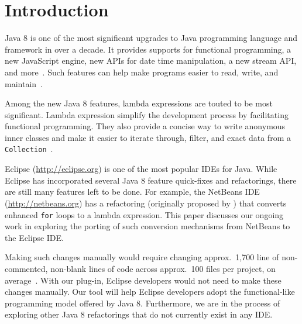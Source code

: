 \section{Introduction}

Java 8 is one of the most significant upgrades to Java programming language
and framework in over a decade. It provides supports for functional
programming, a new JavaScript engine, new APIs for date time manipulation, a
new stream API, and more~\cite{newjdk}. Such features can help make programs
easier to read, write, and maintain~\cite{gyori2013}.

Among the new Java 8 features, lambda expressions are touted to be most
significant. Lambda expression simplify the development process by
facilitating functional programming. They also provide a concise way to write
anonymous inner classes and make it easier to iterate through, filter, and
exact data from a \lstinline{Collection}~\cite{lambdaqs}.

Eclipse (\url{http://eclipse.org}) is one of the most popular IDEs for
Java. While Eclipse has incorporated several Java 8 feature
quick-fixes
and refactorings, there
are still many features left to be done. For example, the NetBeans
IDE (\url{http://netbeans.org}) has a refactoring (originally proposed
by \citet{gyori2013}) that converts enhanced \lstinline{for} loops to a lambda
expression.  This paper discusses our ongoing work in exploring the porting of
such conversion mechanisms from NetBeans to the Eclipse IDE\@. 

Making such changes manually would require changing approx.~1,700 line of
non-commented, non-blank lines of code across approx.~100 files per project,
on average~\cite{gyori2013}. With our plug-in, Eclipse developers would not
need to make these changes manually.  Our tool will help Eclipse developers
adopt the functional-like programming model offered by Java 8. Furthermore, we
are in the process of exploring other Java 8 refactorings that do not
currently exist in any IDE\@. 
